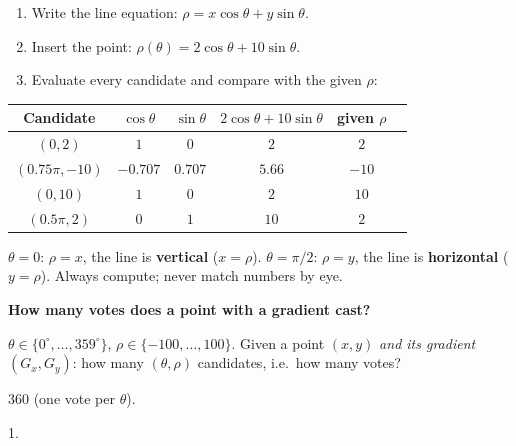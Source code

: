 \documentclass[11pt,a4paper]{article}
\newcommand{\ok}{\textcolor{rightc}{\ding{51}}}
\newcommand{\bad}{\textcolor{wrongc}{\ding{55}}}
\newcommand{\keep}[1]{\par
  \ifdim\dimexpr\pagegoal-\pagetotal\relax<#1\relax\newpage\fi}
\newcommand{\sub}[1]{\keep{6cm}\medskip
  {\sffamily\bfseries\large\color{accent}#1}\par\smallskip}
\begin{document}
\begin{steps}
\begin{enumerate}[leftmargin=*]
  \item Write the line equation: $\boxed{\rho = x\cos\theta + y\sin\theta}$.
  \item Insert the point: $\rho(\theta) = 2\cos\theta + 10\sin\theta$.
  \item Evaluate every candidate and compare with the given $\rho$:
\end{enumerate}
\centering\small
\begin{tabular}{@{}cccccc@{}}
  \toprule
  Candidate & $\cos\theta$ & $\sin\theta$ & $2\cos\theta+10\sin\theta$ & given $\rho$ & \\
  \midrule
  $(0,2)$ & $1$ & $0$ & $2$ & $2$ & \ok \\
  $(0.75\pi,-10)$ & $-0.707$ & $0.707$ & $5.66$ & $-10$ & \bad \\
  $(0,10)$ & $1$ & $0$ & $2$ & $10$ & \bad \\
  $(0.5\pi,2)$ & $0$ & $1$ & $10$ & $2$ & \bad \\
  \bottomrule
\end{tabular}
\end{steps}

\begin{hook}
$\theta=0$: $\rho = x$, the line is \textbf{vertical} ($x=\rho$). \quad
$\theta=\pi/2$: $\rho = y$, the line is \textbf{horizontal} ($y=\rho$).
Always compute; never match numbers by eye.
\end{hook}

\sub{How many votes does a point with a gradient cast?}

\begin{question}
$\theta\in\{0^\circ,\dots,359^\circ\}$, $\rho\in\{-100,\dots,100\}$. Given a
point $(x,y)$ \emph{and its gradient} $(G_x,G_y)$: how many $(\theta,\rho)$
candidates, i.e.\ how many votes?
\end{question}
\begin{yours}
360 (one vote per $\theta$).
\end{yours}
\begin{correct}
1.
\end{correct}
\end{document}
